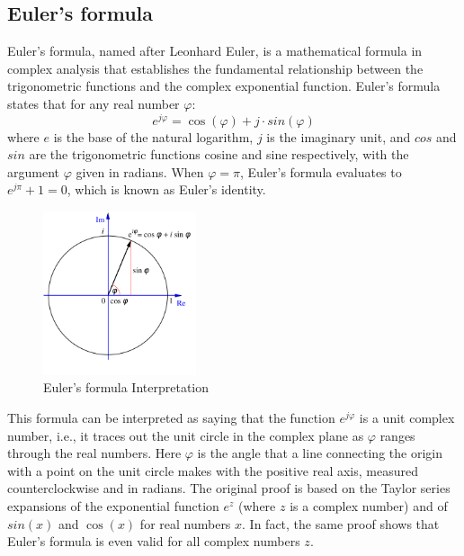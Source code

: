 \documentclass[12pt,oneside,openany]{memoir}
\numberwithin{equation}{subsection}
\begin{document}
\subsection{Euler's formula}
Euler's formula, named after Leonhard Euler, is a mathematical formula in
complex analysis that establishes the fundamental relationship between the
trigonometric functions and the complex exponential function. Euler's formula
states that for any real number \(\varphi\):
\[
	e^{j \varphi} = \cos(\varphi) + j \cdot sin(\varphi)
\]
where \(e\) is the base of the natural logarithm, \(j\) is the imaginary unit,
and \(cos\) and \(sin\) are the trigonometric functions cosine and sine
respectively, with the argument \(\varphi\) given in radians.
\bigbreak
When \(\varphi = \pi\), Euler's formula evaluates to \(e^{j \pi} + 1 = 0\),
which is known as Euler's identity.
\bigbreak
\begin{figure}
	\centering
	\captionsetup{justification=centering}
	\includegraphics[width=0.4\textwidth]{images/euler_s_formula.png}
	\caption{Euler's formula Interpretation}
\end{figure}
This formula can be interpreted as saying that the function \(e^{j \varphi}\) is
a unit complex number, i.e., it traces out the unit circle in the complex plane
as \(\varphi\) ranges through the real numbers. Here \(\varphi\) is the angle
that a line connecting the origin with a point on the unit circle makes with the
positive real axis, measured counterclockwise and in radians.
\bigbreak
The original proof is based on the Taylor series expansions of the exponential
function \(e^z\) (where \(z\) is a complex number) and of \(sin(x)\) and
\(\cos(x)\) for real numbers \(x\). In fact, the same proof shows that Euler's
formula is even valid for all complex numbers \(z\). 

\end{document}
